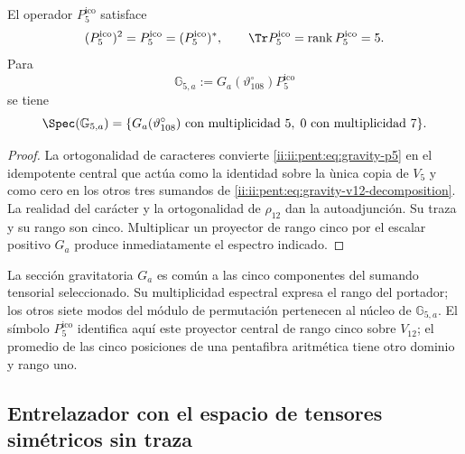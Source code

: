 \begin{theorem}
\label{ii:ii:pent:thm:gravity-p5-coupling}
El operador \(P^{\mathrm{ico}}_5\) satisface
\begin{equation}
\label{ii:ii:pent:eq:gravity-p5-properties}
(P^{\mathrm{ico}}_5)^2=P^{\mathrm{ico}}_5=(P^{\mathrm{ico}}_5)^*,
\qquad \Tr P^{\mathrm{ico}}_5=\operatorname{rank} P^{\mathrm{ico}}_5=5.
\end{equation}
Para
\begin{equation}
\label{ii:ii:pent:eq:gravity-G5}
\mathbb G_{5,a}:=G_a(\vartheta^\circ_{108})P^{\mathrm{ico}}_5
\end{equation}
se tiene
\begin{equation}
\label{ii:ii:pent:eq:gravity-G5-spectrum}
\Spec(\mathbb G_{5,a})
=\{G_a(\vartheta^\circ_{108})\text{ con multiplicidad }5,
\;0\text{ con multiplicidad }7\}.
\end{equation}
\end{theorem}

\begin{proof}
La ortogonalidad de caracteres convierte \eqref{ii:ii:pent:eq:gravity-p5} en el
idempotente central que act\'ua como la identidad sobre la \`unica copia de
\(V_5\) y como cero en los otros tres sumandos de
\eqref{ii:ii:pent:eq:gravity-v12-decomposition}. La realidad del car\'acter y la
ortogonalidad de \(\rho_{12}\) dan la autoadjunci\'on. Su traza y su rango
son cinco. Multiplicar un proyector de rango cinco por el escalar positivo
\(G_a\) produce inmediatamente el espectro indicado.
\end{proof}

La sección gravitatoria \(G_a\) es común a las cinco componentes del
sumando tensorial seleccionado. Su multiplicidad espectral expresa el
rango del portador; los otros siete modos del módulo de permutación
pertenecen al núcleo de \(\mathbb G_{5,a}\). El símbolo
\(P^{\mathrm{ico}}_5\) identifica aquí este proyector central de rango
cinco sobre \(V_{12}\); el promedio de las cinco posiciones de una
pentafibra aritmética tiene otro dominio y rango uno.

\subsection{Entrelazador con el espacio de tensores sim\'etricos sin traza}

